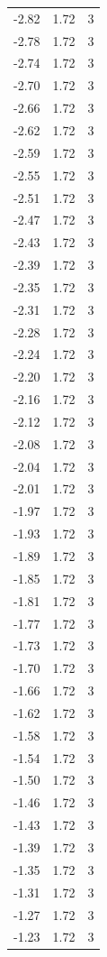 \begin{longtable}{lrr}
  -2.82 & 1.72 & 3 \\
  -2.78 & 1.72 & 3 \\
  -2.74 & 1.72 & 3 \\
  -2.70 & 1.72 & 3 \\
  -2.66 & 1.72 & 3 \\
  -2.62 & 1.72 & 3 \\
  -2.59 & 1.72 & 3 \\
  -2.55 & 1.72 & 3 \\
  -2.51 & 1.72 & 3 \\
  -2.47 & 1.72 & 3 \\
  -2.43 & 1.72 & 3 \\
  -2.39 & 1.72 & 3 \\
  -2.35 & 1.72 & 3 \\
  -2.31 & 1.72 & 3 \\
  -2.28 & 1.72 & 3 \\
  -2.24 & 1.72 & 3 \\
  -2.20 & 1.72 & 3 \\
  -2.16 & 1.72 & 3 \\
  -2.12 & 1.72 & 3 \\
  -2.08 & 1.72 & 3 \\
  -2.04 & 1.72 & 3 \\
  -2.01 & 1.72 & 3 \\
  -1.97 & 1.72 & 3 \\
  -1.93 & 1.72 & 3 \\
  -1.89 & 1.72 & 3 \\
  -1.85 & 1.72 & 3 \\
  -1.81 & 1.72 & 3 \\
  -1.77 & 1.72 & 3 \\
  -1.73 & 1.72 & 3 \\
  -1.70 & 1.72 & 3 \\
  -1.66 & 1.72 & 3 \\
  -1.62 & 1.72 & 3 \\
  -1.58 & 1.72 & 3 \\
  -1.54 & 1.72 & 3 \\
  -1.50 & 1.72 & 3 \\
  -1.46 & 1.72 & 3 \\
  -1.43 & 1.72 & 3 \\
  -1.39 & 1.72 & 3 \\
  -1.35 & 1.72 & 3 \\
  -1.31 & 1.72 & 3 \\
  -1.27 & 1.72 & 3 \\
  -1.23 & 1.72 & 3 \\

\end{longtable}
